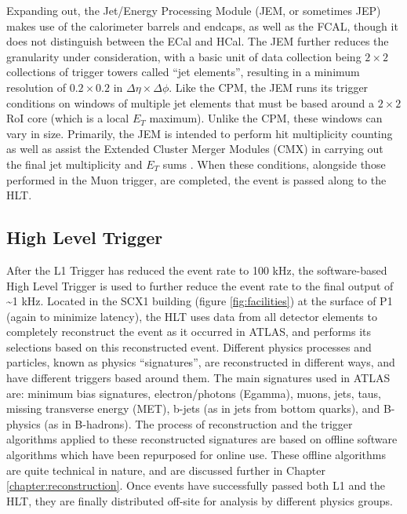         Expanding out, the Jet/Energy Processing Module (JEM, or sometimes JEP) makes use of the calorimeter barrels and endcaps, as well as the FCAL, though it does not distinguish between the ECal and HCal.
        The JEM further reduces the granularity under consideration, with a basic unit of data collection being $2 \times 2$ collections of trigger towers called ``jet elements'', resulting in a minimum resolution of $0.2 \times 0.2$ in $\Delta \eta \times \Delta \phi$.
        Like the CPM, the JEM runs its trigger conditions on windows of multiple jet elements that must be based around a $2 \times 2$ RoI core (which is a local $E_T$ maximum).
        Unlike the CPM, these windows can vary in size.
        Primarily, the JEM is intended to perform hit multiplicity counting as well as assist the Extended Cluster Merger Modules (CMX) in carrying out the final jet multiplicity and $E_T$ sums \cite{L1_calo_run1}\cite{trigger_run2}.
        When these conditions, alongside those performed in the Muon trigger, are completed, the event is passed along to the HLT.


\FloatBarrier
    \subsection{High Level Trigger}

        After the L1 Trigger has reduced the event rate to 100 kHz, the software-based High Level Trigger is used to further reduce the event rate to the final output of \textasciitilde 1 kHz.
        Located in the SCX1 building (figure \ref{fig:facilities}) at the surface of P1 (again to minimize latency), the HLT uses data from all detector elements to completely reconstruct the event as it occurred in ATLAS, and performs its selections based on this reconstructed event.
        Different physics processes and particles, known as physics ``signatures'', are reconstructed in different ways, and have different triggers based around them. 
        The main signatures used in ATLAS are: minimum bias signatures, electron/photons (Egamma), muons, jets, taus, missing transverse energy (MET), b-jets (as in jets from bottom quarks), and B-physics (as in B-hadrons).
        The process of reconstruction and the trigger algorithms applied to these reconstructed signatures are based on offline software algorithms which have been repurposed for online use.
        These offline algorithms are quite technical in nature, and are discussed further in Chapter \ref{chapter:reconstruction}.
        Once events have successfully passed both L1 and the HLT, they are finally distributed off-site for analysis by different physics groups.

